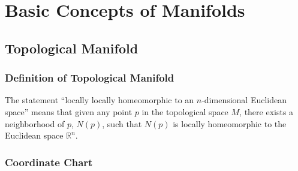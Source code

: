 \documentclass{report}
\begin{document}
\chapter{Basic Concepts of Manifolds}
\section{Topological Manifold}
\subsection{Definition of Topological Manifold}

The statement “locally locally homeomorphic to an $n$-dimensional Euclidean space” means that given any point $p$ in the topological space $M$, there exists a neighborhood of $p$, $N(p)$, such that $N(p)$ is locally homeomorphic to the Euclidean space $\mathbb{R}^n$.

\subsection{Coordinate Chart}



\end{document}
